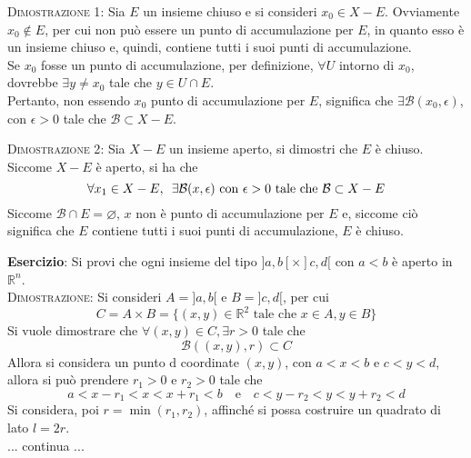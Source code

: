 \documentclass[a4paper]{extarticle}
\begin{document}
\vspace{2em}
\noindent
\normalfont \normalsize
\textsc{Dimostrazione 1}: Sia $E$ un insieme chiuso e si consideri $x_0 \in X-E$. Ovviamente $x_0 \notin E$, per cui non può essere un punto di accumulazione per $E$, in quanto esso è un insieme chiuso e, quindi, contiene tutti i suoi punti di accumulazione.\\
Se $x_0$ fosse un punto di accumulazione, per definizione, $\forall U$ intorno di $x_0$, dovrebbe $\exists y \neq x_0$ tale che $y \in U \cap E$.\\
Pertanto, non essendo $x_0$ punto di accumulazione per $E$, significa che $\exists \mathcal{B}(x_0,\epsilon)$, con $\epsilon>0$ tale che $\mathcal{B} \subset X - E$.

\vspace{2em}
\noindent
\normalfont \normalsize
\textsc{Dimostrazione 2}: Sia $X - E$ un insieme aperto, si dimostri che $E$ è chiuso.\\
Siccome $X-E$ è aperto, si ha che
\[\forall x_1 \in X - E, \hspace{0.5em} \exists \mathcal{B}(x,\epsilon) \text{ con } \epsilon>0 \text{ tale che } \mathcal{B} \subset X - E\]
Siccome $\mathcal{B} \cap E = \varnothing$, $x$ non è punto di accumulazione per $E$ e, siccome ciò significa che $E$ contiene tutti i suoi punti di accumulazione, $E$ è chiuso.

\vspace{2em}
\noindent
\textbf{Esercizio}: Si provi che ogni insieme del tipo $]a,b[ \times ]c,d[$ con $a<b$ è aperto in $\mathbb{R}^n$.\\

\vspace{2em}
\noindent
\normalfont \normalsize
\textsc{Dimostrazione}: Si consideri $A=]a,b[$ e $B=]c,d[$, per cui
\[C=A \times B = \{(x,y) \in \mathbb{R}^2 \text{ tale che } x \in A, y \in B\}\]
Si vuole dimostrare che $\forall (x,y) \in C, \exists r > 0$ tale che
\[\mathcal{B} \left((x,y), r\right) \subset C\]
Allora si considera un punto d coordinate $(x,y)$, con $a<x<b$ e $c<y<d$, allora si può prendere $r_1>0$ e $r_2>0$ tale che
\[a < x-r_1 < x < x+r_1 < b \hspace{1em} \text{e} \hspace{1em} c < y-r_2 < y < y+r_2 < d\]
Si considera, poi $r = \min(r_1,r_2)$, affinché si possa costruire un quadrato di lato $l=2r$.\\
... continua ...
\end{document}
